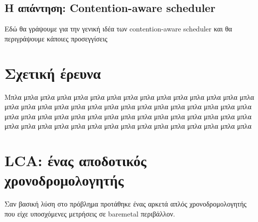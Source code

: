 \subsection{Η απάντηση: Contention-aware scheduler}
Εδώ θα γράψουμε για την γενική ιδέα των contention-aware scheduler και θα
περιγράψουμε κάποιες προσεγγίσεις



\section{Σχετική έρευνα}
Μπλα μπλα μπλα μπλα μπλα μπλα μπλα μπλα μπλα μπλα μπλα μπλα μπλα μπλα μπλα 
μπλα μπλα μπλα μπλα μπλα μπλα μπλα μπλα μπλα μπλα μπλα μπλα μπλα μπλα μπλα 
μπλα μπλα μπλα μπλα μπλα μπλα μπλα μπλα μπλα μπλα μπλα μπλα μπλα μπλα μπλα 
μπλα μπλα μπλα μπλα μπλα μπλα μπλα μπλα μπλα μπλα μπλα μπλα μπλα μπλα μπλα 
\section{LCA: ένας αποδοτικός χρονοδρομολογητής}
Σαν βασική λύση στο πρόβλημα προτάθηκε ένας αρκετά απλός χρονοδρομολογητής που
είχε υποσχόμενες μετρήσεις σε baremetal περιβάλλον.
